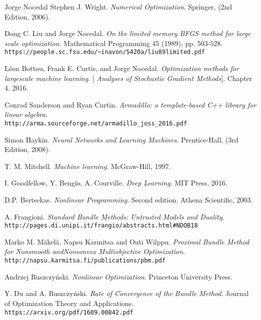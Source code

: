 \begin{thebibliography}{9}

	Jorge Nocedal  Stephen J. Wright.
	\textit{Numerical Optimization}. Springer, (2nd Edition, 2006).

	Dong C. Liu and Jorge Nocedal.
	\textit{On the limited memory BFGS method for large scale optimization}. Mathematical Programming 45 (1989), pp. 503-528.
	\\\texttt{https://people.sc.fsu.edu/\textasciitilde inavon/5420a/liu89limited.pdf}
		
	Léon Bottou, Frank E. Curtis, and Jorge Nocedal.
	\textit{Optimization methods for largescale machine learning}. 
	[\textit{ Analyses of Stochastic Gradient Methods}]. Chapter 4.
	2016.
	
	Conrad Sanderson and Ryan Curtin. 
	\textit{Armadillo: a template-based C++ library for linear algebra}. 
	\\\texttt{http://arma.sourceforge.net/armadillo\_joss\_2016.pdf}

	
	Simon Haykin. 
	\textit{Neural Networks and Learning Machines}. 
	Prentice-Hall, (3rd Edition, 2008).


	T. M. Mitchell. 
	\textit{Machine learning}. 
	McGraw-Hill, 1997.
	
	I. Goodfellow, Y. Bengio, A. Courville. 
	\textit{Deep Learning}. 
	MIT Press,  2016.
	
	D.P. Bertsekas.
	\textit{Nonlinear Programming}. 
	Second edition. Athena Scientific, 2003.
	
	A. Frangioni.
	\textit{Standard Bundle Methods: Untrusted Models and Duality}.
	\\\texttt{http://pages.di.unipi.it/frangio/abstracts.html\#NDOB18}
	
	Marko M. M\"akel\"a, Napsu Karmitsa and Outi Wilppu.
	\textit{Proximal Bundle Method for Nonsmooth andNonconvex Multiobjective Optimization}.
	\\\texttt{http://napsu.karmitsa.fi/publications/pbm.pdf}
	
	Andrzej Ruszczyński.
	\textit{Nonlinear Optimization}. Princeton University Press. 
	
	Y. Du and A. Ruszczyński.
	\textit{Rate of Convergence of the Bundle Method}. Journal  of  Optimization Theory and Applications.
	\\\texttt{https://arxiv.org/pdf/1609.00842.pdf}


\end{thebibliography}
